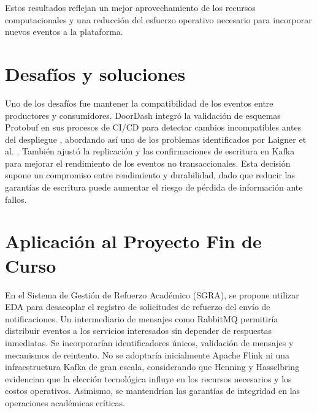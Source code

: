 Estos resultados reflejan un mejor aprovechamiento de los recursos computacionales y una reducción del esfuerzo operativo necesario para incorporar nuevos eventos a la plataforma.


\section{Desafíos y soluciones}

Uno de los desafíos fue mantener la compatibilidad de los eventos entre productores y consumidores. DoorDash integró la validación de esquemas Protobuf en sus procesos de CI/CD para detectar cambios incompatibles antes del despliegue \cite{wang2022iguazu}, abordando así uno de los problemas identificados por Laigner et al. \cite{laigner2026events}. También ajustó la replicación y las confirmaciones de escritura en Kafka para mejorar el rendimiento de los eventos no transaccionales. Esta decisión supone un compromiso entre rendimiento y durabilidad, dado que reducir las garantías de escritura puede aumentar el riesgo de pérdida de información ante fallos.

\section{Aplicación al Proyecto Fin de Curso}

En el Sistema de Gestión de Refuerzo Académico (SGRA), se propone utilizar EDA para desacoplar el registro de solicitudes de refuerzo del envío de notificaciones. Un intermediario de mensajes como RabbitMQ permitiría distribuir eventos a los servicios interesados sin depender de respuestas inmediatas. Se incorporarían identificadores únicos, validación de mensajes y mecanismos de reintento. No se adoptaría inicialmente Apache Flink ni una infraestructura Kafka de gran escala, considerando que Henning y Hasselbring \cite{henning2024scalability} evidencian que la elección tecnológica influye en los recursos necesarios y los costos operativos. Asimismo, se mantendrían las garantías de integridad en las operaciones académicas críticas.
